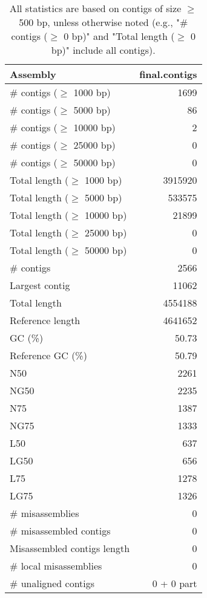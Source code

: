 \documentclass[12pt,a4paper]{article}
\begin{document}
\begin{table}[ht]
\begin{center}
\caption{All statistics are based on contigs of size $\geq$ 500 bp, unless otherwise noted (e.g., "\# contigs ($\geq$ 0 bp)" and "Total length ($\geq$ 0 bp)" include all contigs).}
\begin{tabular}{|l*{1}{|r}|}
\hline
Assembly & final.contigs \\ \hline
\# contigs ($\geq$ 1000 bp) & 1699 \\ \hline
\# contigs ($\geq$ 5000 bp) & 86 \\ \hline
\# contigs ($\geq$ 10000 bp) & 2 \\ \hline
\# contigs ($\geq$ 25000 bp) & 0 \\ \hline
\# contigs ($\geq$ 50000 bp) & 0 \\ \hline
Total length ($\geq$ 1000 bp) & 3915920 \\ \hline
Total length ($\geq$ 5000 bp) & 533575 \\ \hline
Total length ($\geq$ 10000 bp) & 21899 \\ \hline
Total length ($\geq$ 25000 bp) & 0 \\ \hline
Total length ($\geq$ 50000 bp) & 0 \\ \hline
\# contigs & 2566 \\ \hline
Largest contig & 11062 \\ \hline
Total length & 4554188 \\ \hline
Reference length & 4641652 \\ \hline
GC (\%) & 50.73 \\ \hline
Reference GC (\%) & 50.79 \\ \hline
N50 & 2261 \\ \hline
NG50 & 2235 \\ \hline
N75 & 1387 \\ \hline
NG75 & 1333 \\ \hline
L50 & 637 \\ \hline
LG50 & 656 \\ \hline
L75 & 1278 \\ \hline
LG75 & 1326 \\ \hline
\# misassemblies & 0 \\ \hline
\# misassembled contigs & 0 \\ \hline
Misassembled contigs length & 0 \\ \hline
\# local misassemblies & 0 \\ \hline
\# unaligned contigs & 0 + 0 part \\ \hline

\end{tabular}
\end{center}
\end{table}
\end{document}
